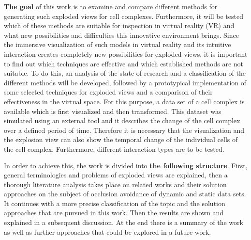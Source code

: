 \textbf{The goal} of this work is to examine and compare different methods for generating such exploded views for cell complexes. Furthermore, it will be tested which of these methods are suitable for inspection in virtual reality (VR) and what new possibilities and difficulties this innovative environment brings.
Since the immersive visualization of such models in virtual reality and its intuitive interaction creates completely new possibilities for exploded views, it is important to find out which techniques are effective and which established methods are not suitable.
To do this, an analysis of the state of research and a classification of the different methods will be developed, followed by a prototypical implementation of some selected techniques for exploded views and a comparison of their effectiveness in the virtual space.
For this purpose, a data set of a cell complex is available which is first visualized and then transformed. 
This dataset was simulated using an external tool and it describes the change of the cell complex over a defined period of time. 
Therefore it is necessary that the visualization and the explosion view can also show the temporal change of the individual cells of the cell complex.
Furthermore, different interaction types are to be tested. 

In order to achieve this, the work is divided into \textbf{the following structure}. 
First, general terminologies and problems of exploded views are explained, then a thorough literature analysis takes place on related works and their solution approaches on the subject of occlusion avoidance of dynamic and static data sets.
It continues with a more precise classification of the topic and the solution approaches that are pursued in this work. 
Then the results are shown and explained in a subsequent discussion. At the end there is a summary of the work as well as further approaches that could be explored in a future work.

